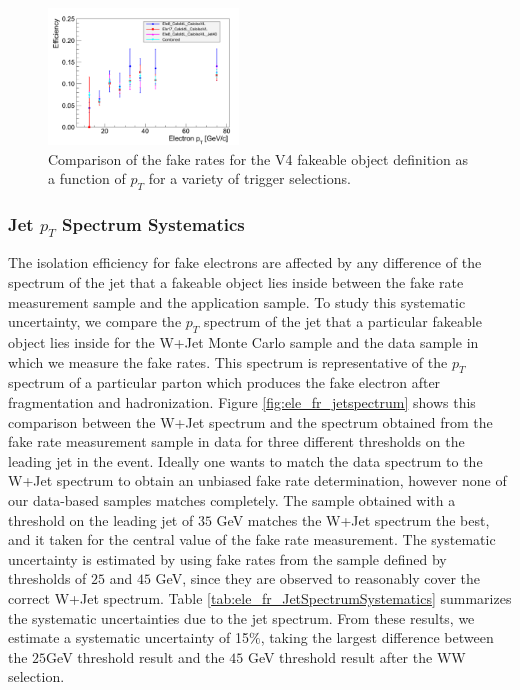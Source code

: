 \begin{figure}[!htbp]
\begin{center}
\includegraphics[width=0.45\textwidth]{figures/ElectronFakeRate_DenominatorV4_TriggerDependence.pdf}
\caption{Comparison of the fake rates for the V4 fakeable object definition as a function of $p_T$
for a variety of trigger selections.}
\label{fig:ele_fr_triggerDependence}
\end{center}
\end{figure}


\subsubsection{Jet $p_{T}$ Spectrum Systematics}
\label{sec:FakeElectronBkgJetSpectrumSystematics}

The isolation efficiency for fake electrons are affected by any difference of the spectrum of the
jet that a fakeable object lies inside between the fake rate measurement sample and the 
application sample. To study this systematic uncertainty, we compare the $p_{T}$ spectrum 
of the jet that a particular fakeable object lies inside for the W+Jet Monte Carlo sample and the
data sample in which we measure the fake rates. This spectrum is representative of the $p_{T}$
spectrum of a particular parton which produces the fake electron after fragmentation and 
hadronization. Figure \ref{fig:ele_fr_jetspectrum} shows this comparison between the W+Jet spectrum and the
spectrum obtained from the fake rate measurement sample in data for three different 
thresholds on the leading jet in the event. Ideally one wants to match the data spectrum to the
W+Jet spectrum to obtain an unbiased fake rate determination, however none of our data-based
samples matches completely. The sample obtained with a threshold on the leading jet of
$35$ GeV matches the W+Jet spectrum the best, and it taken for the central value of the 
fake rate measurement. The systematic uncertainty is estimated by using fake rates from the sample 
defined by thresholds of $25$ and $45$ GeV, since they are observed to reasonably cover the 
correct W+Jet spectrum. Table \ref{tab:ele_fr_JetSpectrumSystematics} summarizes the systematic
uncertainties due to the jet spectrum. From these results, we estimate a systematic uncertainty 
of 15$\%$, taking the largest difference between the $25$GeV threshold result and the $45$ GeV 
threshold result after the WW selection.

